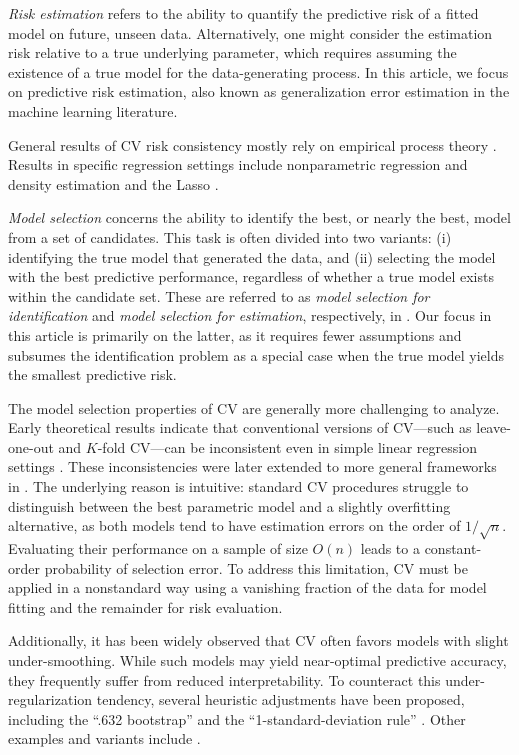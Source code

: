 \documentclass[11pt]{article}
\theoremstyle{plain}
\begin{document}
\emph{Risk estimation} refers to the ability to quantify the predictive risk of a fitted model on future, unseen data. Alternatively, one might consider the estimation risk relative to a true underlying parameter, which requires assuming the existence of a true model for the data-generating process. In this article, we focus on predictive risk estimation, also known as generalization error estimation in the machine learning literature. 

General results of CV risk consistency mostly rely on empirical process theory \citep{devroye1988automatic,vaart2006oracle,lecue2012oracle}.
Results in specific regression settings include nonparametric regression and density estimation \citep{devroye2001combinatorial,gyorfi2006distribution} and the Lasso \citep{homrighausen2017risk}. 

\emph{Model selection} concerns the ability to identify the best, or nearly the best, model from a set of candidates. This task is often divided into two variants: (i) identifying the true model that generated the data, and (ii) selecting the model with the best predictive performance, regardless of whether a true model exists within the candidate set. These are referred to as \emph{model selection for identification} and \emph{model selection for estimation}, respectively, in \cite{arlot2010survey}. Our focus in this article is primarily on the latter, as it requires fewer assumptions and subsumes the identification problem as a special case when the true model yields the smallest predictive risk.

The model selection properties of CV are generally more challenging to analyze. Early theoretical results indicate that conventional versions of CV---such as leave-one-out and $K$-fold CV---can be inconsistent even in simple linear regression settings \citep{Zhang93,Shao93}. These inconsistencies were later extended to more general frameworks in \cite{yang2007consistency}. The underlying reason is intuitive: standard CV procedures struggle to distinguish between the best parametric model and a slightly overfitting alternative, as both models tend to have estimation errors on the order of $1/\sqrt{n}$. Evaluating their performance on a sample of size $O(n)$ leads to a constant-order probability of selection error. To address this limitation, CV must be applied in a nonstandard way using a vanishing fraction of the data for model fitting and the remainder for risk evaluation.

Additionally, it has been widely observed that CV often favors models with slight under-smoothing. While such models may yield near-optimal predictive accuracy, they frequently suffer from reduced interpretability. To counteract this under-regularization tendency, several heuristic adjustments have been proposed, including the “.632 bootstrap” \citep{efron1997improvements} and the “1-standard-deviation rule” \citep{tibshirani2009bias}. Other examples and variants include \cite{yu2014modified,feng2019restricted}.
\end{document}
